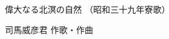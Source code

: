 \documentclass[10pt,b5j]{tarticle} %
\begin{document}
\begin{minipage}[c]{0.7\hsize} %
    \begin{center}
        {\LARGE
            偉大なる北溟の自然 %
        }
        {\small 
            （昭和三十九年寮歌） %
        }
    \end{center}
\end{minipage}
\begin{minipage}[c]{0.3\hsize} %
    \begin{flushright} %
        司馬威彦君 作歌・作曲 %
    \end{flushright}
\end{minipage}
\end{document}
